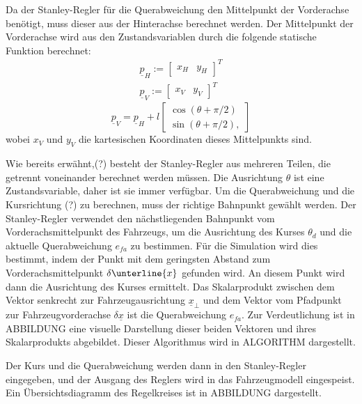 \documentclass[arbeit=studie,oneside,BCOR=12mm]{ArbeitRST}
\begin{document}
Da der Stanley-Regler für die Querabweichung den Mittelpunkt der Vorderachse
benötigt, muss dieser aus der Hinterachse berechnet werden. Der Mittelpunkt der
Vorderachse wird aus den Zustandsvariablen durch die folgende statische
Funktion berechnet: 
\begin{gather}
  \underline{p}_H := 
  \begin{bmatrix}
    x_H & y_H
  \end{bmatrix}^T \\
  \underline{p}_V := 
  \begin{bmatrix}
    x_V & y_V
  \end{bmatrix}^T
  \label{eq:Rear Axle and Front Axle}
\end{gather}
\begin{equation}
  \underline{p}_V = \underline{p}_H + l 
  \begin{bmatrix}
    \cos(\theta + \pi/2) \\ 
    \sin(\theta + \pi/2),
  \end{bmatrix}
  \label{eq:Transformation from Rear Axle to Front Axle}
\end{equation}
wobei $x_V$ und $y_V$ die kartesischen Koordinaten dieses Mittelpunkts sind. 

Wie bereits erwähnt,(?) besteht der Stanley-Regler aus mehreren Teilen, die
getrennt voneinander berechnet werden müssen. Die Ausrichtung $\theta$ ist eine
Zustandsvariable, daher ist sie immer verfügbar. Um die Querabweichung und die
Kursrichtung (?) zu berechnen, muss der richtige Bahnpunkt gewählt werden. Der
Stanley-Regler verwendet den nächstliegenden Bahnpunkt vom
Vorderachsmittelpunkt des Fahrzeugs, um die Ausrichtung des Kurses $\theta_d$
und die aktuelle Querabweichung $e_{fa}$ zu bestimmen. Für die Simulation wird
dies bestimmt, indem der Punkt mit dem geringsten Abstand zum
Vorderachsmittelpunkt $\delta\unterline{x}$ gefunden wird. An diesem Punkt wird
dann die Ausrichtung des Kurses ermittelt. Das Skalarprodukt zwischen dem
Vektor senkrecht zur Fahrzeugausrichtung $\underline{x}_{\perp}$ und dem Vektor
vom Pfadpunkt zur Fahrzeugvorderachse $\delta\underline{x}$ ist die
Querabweichung $e_{fa}$. Zur Verdeutlichung ist in ABBILDUNG eine visuelle
Darstellung dieser beiden Vektoren und ihres Skalarprodukts abgebildet. Dieser
Algorithmus wird in ALGORITHM dargestellt. 

Der Kurs und die Querabweichung werden dann in den Stanley-Regler eingegeben,
und der Ausgang des Reglers wird in das Fahrzeugmodell eingespeist. Ein
Übersichtsdiagramm des Regelkreises ist in ABBILDUNG dargestellt.
\end{document}
